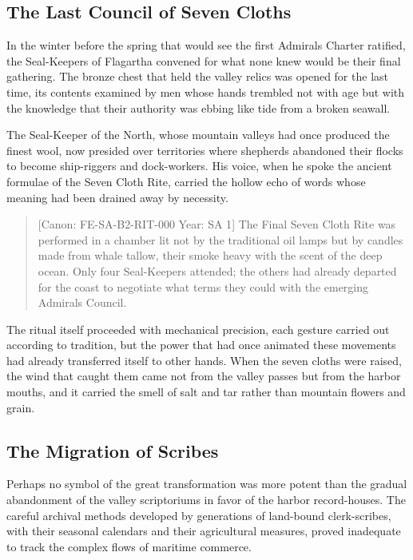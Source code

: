 \subsection{The Last Council of Seven
Cloths}\label{the-last-council-of-seven-cloths}

In the winter before the spring that would see the first
Admiral\textquotesingle s Charter ratified, the Seal-Keepers of
Flagartha convened for what none knew would be their final gathering.
The bronze chest that held the valley relics was opened for the last
time, its contents examined by men whose hands trembled not with age but
with the knowledge that their authority was ebbing like tide from a
broken seawall.

The Seal-Keeper of the North, whose mountain valleys had once produced
the finest wool, now presided over territories where shepherds abandoned
their flocks to become ship-riggers and dock-workers. His voice, when he
spoke the ancient formulae of the Seven Cloth Rite, carried the hollow
echo of words whose meaning had been drained away by necessity.

\begin{quote}
{[}Canon: FE-SA-B2-RIT-000 \textbar{} Year: SA 1{]} The Final Seven
Cloth Rite was performed in a chamber lit not by the traditional oil
lamps but by candles made from whale tallow, their smoke heavy with the
scent of the deep ocean. Only four Seal-Keepers attended; the others had
already departed for the coast to negotiate what terms they could with
the emerging Admiral\textquotesingle s Council.
\end{quote}

The ritual itself proceeded with mechanical precision, each gesture
carried out according to tradition, but the power that had once animated
these movements had already transferred itself to other hands. When the
seven cloths were raised, the wind that caught them came not from the
valley passes but from the harbor mouths, and it carried the smell of
salt and tar rather than mountain flowers and grain.

\subsection{The Migration of Scribes}\label{the-migration-of-scribes}

Perhaps no symbol of the great transformation was more potent than the
gradual abandonment of the valley scriptoriums in favor of the harbor
record-houses. The careful archival methods developed by generations of
land-bound clerk-scribes, with their seasonal calendars and their
agricultural measures, proved inadequate to track the complex flows of
maritime commerce.

